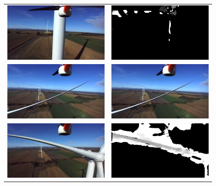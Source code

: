 \begin{figure}
  \begin{tabular}{cc}
    \includegraphics[width=0.5\linewidth]{images/field_stereo_fail_rgb.png} &
    \includegraphics[width=0.5\linewidth]{images/field_stereo_fail_pcl.png} \\
    \includegraphics[width=0.5\linewidth]{images/field_stereo_fail_rgb2.png} &
    \includegraphics[width=0.5\linewidth]{images/field_stereo_fail_rgb2.png} \\
    \includegraphics[width=0.5\linewidth]{images/field_stereo_success_rgb.png} &
    \includegraphics[width=0.5\linewidth]{images/field_stereo_success_pcl.png} \\

\end{tabular}
\end{figure}
